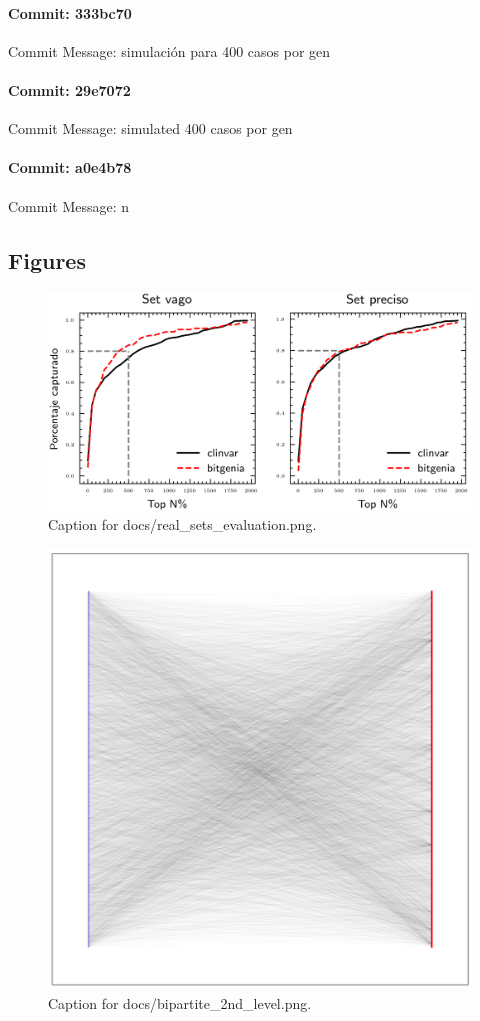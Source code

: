 \documentclass{article}
\begin{document}
\paragraph{Commit: 333bc70}
Commit Message: simulación para 400 casos por gen

\paragraph{Commit: 29e7072}
Commit Message: simulated 400 casos por gen

\paragraph{Commit: a0e4b78}
Commit Message: n

\subsection{Figures}
\begin{figure}[h] \centering \includegraphics{docs/real_sets_evaluation.png} \caption{Caption for docs/real_sets_evaluation.png.} \end{figure}
\begin{figure}[h] \centering \includegraphics{docs/bipartite_2nd_level.png} \caption{Caption for docs/bipartite_2nd_level.png.} \end{figure}
\end{document}
